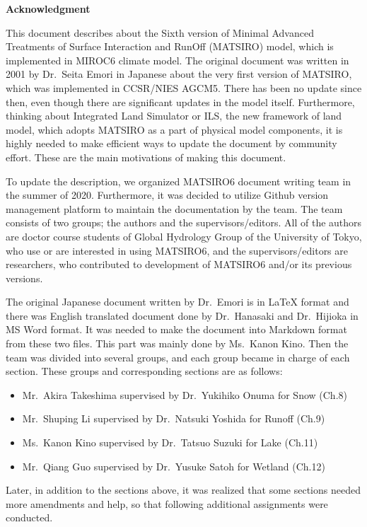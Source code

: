 \textbf{Acknowledgment}

This document describes about the Sixth version of Minimal Advanced
Treatments of Surface Interaction and RunOff (MATSIRO) model, which is
implemented in MIROC6 climate model. The original document was written
in 2001 by Dr.~Seita Emori in Japanese about the very first version of
MATSIRO, which was implemented in CCSR/NIES AGCM5. There has been no
update since then, even though there are significant updates in the
model itself. Furthermore, thinking about Integrated Land Simulator or
ILS, the new framework of land model, which adopts MATSIRO as a part of
physical model components, it is highly needed to make efficient ways to
update the document by community effort. These are the main motivations
of making this document.

To update the description, we organized MATSIRO6 document writing team
in the summer of 2020. Furthermore, it was decided to utilize Github
version management platform to maintain the documentation by the team.
The team consists of two groups; the authors and the
supervisors/editors. All of the authors are doctor course students of
Global Hydrology Group of the University of Tokyo, who use or are
interested in using MATSIRO6, and the supervisors/editors are
researchers, who contributed to development of MATSIRO6 and/or its
previous versions.

The original Japanese document written by Dr.~Emori is in LaTeX format
and there was English translated document done by Dr.~Hanasaki and
Dr.~Hijioka in MS Word format. It was needed to make the document into
Markdown format from these two files. This part was mainly done by
Ms.~Kanon Kino. Then the team was divided into several groups, and each
group became in charge of each section. These groups and corresponding
sections are as follows:

\begin{itemize}
\item
  Mr.~Akira Takeshima supervised by Dr.~Yukihiko Onuma for Snow (Ch.8)
\item
  Mr.~Shuping Li supervised by Dr.~Natsuki Yoshida for Runoff (Ch.9)
\item
  Ms.~Kanon Kino supervised by Dr.~Tatsuo Suzuki for Lake (Ch.11)
\item
  Mr.~Qiang Guo supervised by Dr.~Yusuke Satoh for Wetland (Ch.12)
\end{itemize}

Later, in addition to the sections above, it was realized that some
sections needed more amendments and help, so that following additional
assignments were conducted.

